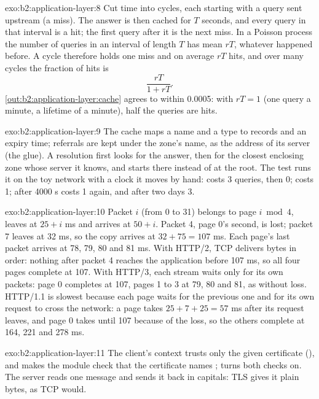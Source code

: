 \begin{solution}{exo:b2:application-layer:8}
Cut time into cycles, each starting with a query sent upstream (a miss). The answer is then cached for $T$ seconds, and
every query in that interval is a hit; the first query after it is the next miss. In a Poisson process the number of
queries in an interval of length $T$ has mean $rT$, whatever happened before. A cycle therefore holds one miss and on
average $rT$ hits, and over many cycles the fraction of hits is
\[
\frac{rT}{1 + rT}.
\]
\cref{out:b2:application-layer:cache} agrees to within 0.0005: with $rT = 1$ (one query a minute, a lifetime of a
minute), half the queries are hits.
\end{solution}

\begin{solution}{exo:b2:application-layer:9}
The cache maps a name and a type to records and an expiry time; referrals are kept under the zone's name, as the
address of its server (the glue). A resolution first looks for the answer, then for the closest enclosing zone whose
server it knows, and starts there instead of at the root. The test runs it on the toy network with a clock it moves by
hand:  costs 3 queries, then 0;  costs 1; after 4000 s  costs 1 again, and after two
days 3.
\end{solution}

\begin{solution}{exo:b2:application-layer:10}
Packet $i$ (from 0 to 31) belongs to page $i \bmod 4$, leaves at $25 + i$ ms and arrives at $50 + i$. Packet 4,
page 0's second, is lost; packet 7 leaves at 32 ms, so the copy arrives at $32 + 75 = 107$ ms. Each page's last packet
arrives at 78, 79, 80 and 81 ms. With HTTP/2, TCP delivers bytes in order: nothing after packet 4 reaches the
application before 107 ms, so all four pages complete at 107. With HTTP/3, each stream waits only for its own
packets: page 0 completes at 107, pages 1 to 3 at 79, 80 and 81, as without loss. HTTP/1.1 is slowest because each
page waits for the previous one and for its own request to cross the network: a page takes $25 + 7 + 25 = 57$ ms
after its request leaves, and page 0 takes until 107 because of the loss, so the others complete at 164, 221 and
278 ms.
\end{solution}

\begin{solution}{exo:b2:application-layer:11}
The client's context trusts only the given certificate (), and  makes the module
check that the certificate names ;  turns both checks on. The
server reads one message and sends it back in capitals: TLS gives it plain bytes, as TCP would.
\end{solution}

